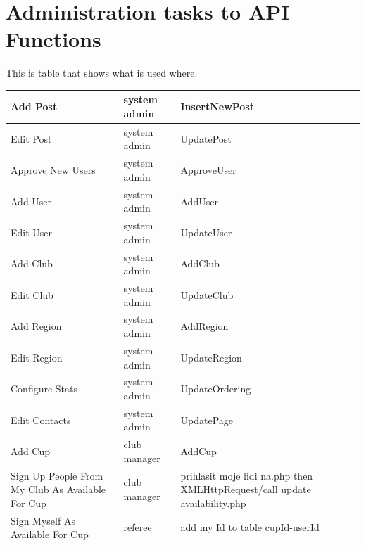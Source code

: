 \section {Administration tasks to API Functions}
This is table that shows what is used where.
\newline
\begin{tabularx}{0.9\textwidth} { 
  | >{\raggedright\arraybackslash}X 
  | >{\centering\arraybackslash}X 
  | >{\raggedright\arraybackslash}X | }
 \hline
 Add Post & system admin& InsertNewPost \\
 \hline
 Edit Post  & system admin  & UpdatePost  \\
 \hline
 Approve New Users & system admin & ApproveUser \\
 \hline
 Add User & system admin & AddUser \\
 \hline
 Edit User & system admin & UpdateUser \\
 \hline
 Add Club & system admin & AddClub \\
 \hline
 Edit Club & system admin & UpdateClub \\
 \hline
 Add Region & system admin & AddRegion \\
 \hline
 Edit Region & system admin & UpdateRegion \\
 \hline
 Configure Stats & system admin & UpdateOrdering \\
 \hline
 Edit Contacts & system admin & UpdatePage \\
 \hline
 Add Cup & club manager & AddCup \\
 \hline
 Sign Up People From My Club As Available For Cup & club manager & prihlasit moje lidi na.php then XMLHttpRequest/call update availability.php \\
 \hline
 Sign Myself As Available For Cup & referee & add my Id to table cupId-userId \\
\hline
\end{tabularx}